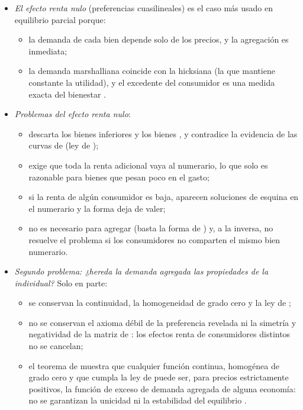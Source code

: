 \documentclass[11pt]{article}
\begin{document}
\begin{itemize}
\item \emph{El efecto renta nulo} (preferencias cuasilineales) es el caso más usado en equilibrio parcial porque:
  \begin{itemize}
  \item la demanda de cada bien depende solo de los precios, y la agregación es inmediata;
  \item la demanda marshalliana coincide con la hicksiana (la que mantiene constante la utilidad), y el excedente del consumidor es una medida exacta del bienestar  .
  \end{itemize}
\item \emph{Problemas del efecto renta nulo}:
  \begin{itemize}
  \item descarta los bienes inferiores y los bienes , y contradice la evidencia de las curvas de  (ley de );
  \item exige que toda la renta adicional vaya al numerario, lo que solo es razonable para bienes que pesan poco en el gasto;
  \item si la renta de algún consumidor es baja, aparecen soluciones de esquina en el numerario y la forma deja de valer;
  \item no es necesario para agregar (basta la forma de ) y, a la inversa, no resuelve el problema si los consumidores no comparten el mismo bien numerario.
  \end{itemize}
\item \emph{Segundo problema: ¿hereda la demanda agregada las propiedades de la individual?} Solo en parte:
  \begin{itemize}
  \item se conservan la continuidad, la homogeneidad de grado cero y la ley de ;
  \item no se conservan el axioma débil de la preferencia revelada ni la simetría y negatividad de la matriz de : los efectos renta de consumidores distintos no se cancelan;
  \item el teorema de \nocite{Sonnenschein1972Market,Sonnenschein1973Walras,Mantel1974Characterization,Debreu1974Excess} muestra que cualquier función continua, homogénea de grado cero y que cumpla la ley de  puede ser, para precios estrictamente positivos, la función de exceso de demanda agregada de alguna economía: no se garantizan la unicidad ni la estabilidad del equilibrio .
  \end{itemize}
\end{itemize}
\end{document}
